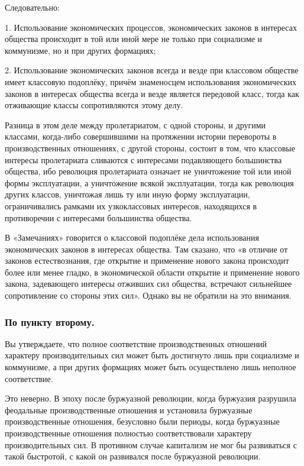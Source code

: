 \documentclass[12pt, a4paper, openany]{book}
\begin{document}
Следовательно:



1. Использование экономических процессов, экономических законов в интересах общества происходит в той или иной мере не только при социализме и коммунизме, но и при других формациях;



2. Использование экономических законов всегда и везде при классовом обществе имеет классовую подоплёку, причём знаменосцем использования экономических законов в интересах общества всегда и везде является передовой класс, тогда как отживающие классы сопротивляются этому делу.



Разница в этом деле между пролетариатом, с одной стороны, и другими классами, когда-либо совершившими на протяжении истории перевороты в производственных отношениях, с другой стороны, состоит в том, что классовые интересы пролетариата сливаются с интересами подавляющего большинства общества, ибо революция пролетариата означает не уничтожение той или иной формы эксплуатации, а уничтожение всякой эксплуатации, тогда как революция других классов, уничтожая лишь ту или иную форму эксплуатации, ограничивались рамками их узкоклассовых интересов, находящихся в противоречии с интересами большинства общества.



В «Замечаниях» говорится о классовой подоплёке дела использования экономических законов в интересах общества. Там сказано, что «в отличие от законов естествознания, где открытие и применение нового закона происходит более или менее гладко, в экономической области открытие и применение нового закона, задевающего интересы отживших сил общества, встречают сильнейшее сопротивление со стороны этих сил». Однако вы не обратили на это внимания.



\subsubsection*{По пункту второму.}





Вы утверждаете, что полное соответствие производственных отношений характеру производительных сил может быть достигнуто лишь при социализме и коммунизме, а при других формациях может быть осуществлено лишь неполное соответствие.



Это неверно. В эпоху после буржуазной революции, когда буржуазия разрушила феодальные производственные отношения и установила буржуазные производственные отношения, безусловно были периоды, когда буржуазные производственные отношения полностью соответствовали характеру производительных сил. В противном случае капитализм не мог бы развиваться с такой быстротой, с какой он развивался после буржуазной революции.
\end{document}
